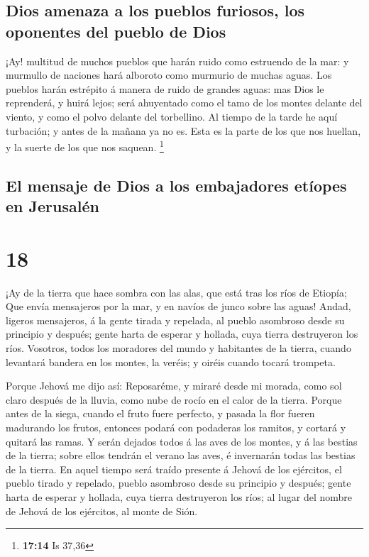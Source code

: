 \hypertarget{dios-amenaza-a-los-pueblos-furiosos-los-oponentes-del-pueblo-de-dios}{%
\subsection{Dios amenaza a los pueblos furiosos, los oponentes del
pueblo de
Dios}\label{dios-amenaza-a-los-pueblos-furiosos-los-oponentes-del-pueblo-de-dios}}

 ¡Ay! multitud de muchos pueblos que harán ruido como
estruendo de la mar: y murmullo de naciones hará alboroto como murmurio
de muchas aguas.  Los pueblos harán estrépito á manera de
ruido de grandes aguas: mas Dios le reprenderá, y huirá lejos; será
ahuyentado como el tamo de los montes delante del viento, y como el
polvo delante del torbellino.  Al tiempo de la tarde he
aquí turbación; y antes de la mañana ya no es. Esta es la parte de los
que nos huellan, y la suerte de los que nos saquean. \footnote{\textbf{17:14}
  Is 37,36}

\hypertarget{el-mensaje-de-dios-a-los-embajadores-etuxedopes-en-jerusaluxe9n}{%
\subsection{El mensaje de Dios a los embajadores etíopes en
Jerusalén}\label{el-mensaje-de-dios-a-los-embajadores-etuxedopes-en-jerusaluxe9n}}

\hypertarget{section-17}{%
\section{18}\label{section-17}}

 ¡Ay de la tierra que hace sombra con las alas, que está
tras los ríos de Etiopía;  Que envía mensajeros por la mar,
y en navíos de junco sobre las aguas! Andad, ligeros mensajeros, á la
gente tirada y repelada, al pueblo asombroso desde su principio y
después; gente harta de esperar y hollada, cuya tierra destruyeron los
ríos.  Vosotros, todos los moradores del mundo y habitantes
de la tierra, cuando levantará bandera en los montes, la veréis; y
oiréis cuando tocará trompeta.

 Porque Jehová me dijo así: Reposaréme, y miraré desde mi
morada, como sol claro después de la lluvia, como nube de rocío en el
calor de la tierra.  Porque antes de la siega, cuando el
fruto fuere perfecto, y pasada la flor fueren madurando los frutos,
entonces podará con podaderas los ramitos, y cortará y quitará las
ramas.  Y serán dejados todos á las aves de los montes, y á
las bestias de la tierra; sobre ellos tendrán el verano las aves, é
invernarán todas las bestias de la tierra.  En aquel tiempo
será traído presente á Jehová de los ejércitos, el pueblo tirado y
repelado, pueblo asombroso desde su principio y después; gente harta de
esperar y hollada, cuya tierra destruyeron los ríos; al lugar del nombre
de Jehová de los ejércitos, al monte de Sión.

